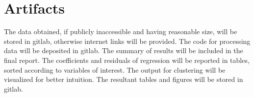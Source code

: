 \documentclass{acm_proc_article-sp}
\begin{document}
\section{Artifacts}
The data obtained, if publicly inaccessible and having reasonable size, will be stored in gitlab, otherwise internet links will be provided. The code for processing data will be deposited in gitlab. The summary of results will be included in the final report. The coefficients and residuals of regression will be reported in tables, sorted according to variables of interest. The output for clustering will be visualized for better intuition. The resultant tables and figures will be stored in gitlab.




\end{document}
